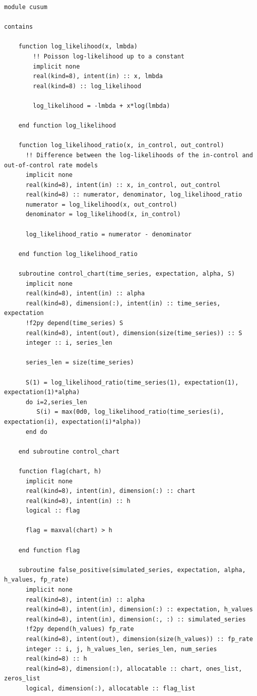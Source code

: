 \documentclass[11pt]{report}
\begin{document}
\begin{verbatim}
module cusum

contains

    function log_likelihood(x, lmbda)
        !! Poisson log-likelihood up to a constant
        implicit none
        real(kind=8), intent(in) :: x, lmbda
        real(kind=8) :: log_likelihood

        log_likelihood = -lmbda + x*log(lmbda)
        
    end function log_likelihood

    function log_likelihood_ratio(x, in_control, out_control)
      !! Difference between the log-likelihoods of the in-control and out-of-control rate models  
      implicit none
      real(kind=8), intent(in) :: x, in_control, out_control
      real(kind=8) :: numerator, denominator, log_likelihood_ratio
      numerator = log_likelihood(x, out_control)
      denominator = log_likelihood(x, in_control)

      log_likelihood_ratio = numerator - denominator
      
    end function log_likelihood_ratio

    subroutine control_chart(time_series, expectation, alpha, S)
      implicit none
      real(kind=8), intent(in) :: alpha
      real(kind=8), dimension(:), intent(in) :: time_series, expectation
      !f2py depend(time_series) S
      real(kind=8), intent(out), dimension(size(time_series)) :: S
      integer :: i, series_len

      series_len = size(time_series)

      S(1) = log_likelihood_ratio(time_series(1), expectation(1), expectation(1)*alpha)
      do i=2,series_len
         S(i) = max(0d0, log_likelihood_ratio(time_series(i), expectation(i), expectation(i)*alpha))
      end do
      
    end subroutine control_chart

    function flag(chart, h)
      implicit none
      real(kind=8), intent(in), dimension(:) :: chart
      real(kind=8), intent(in) :: h
      logical :: flag

      flag = maxval(chart) > h

    end function flag

    subroutine false_positive(simulated_series, expectation, alpha, h_values, fp_rate)
      implicit none
      real(kind=8), intent(in) :: alpha
      real(kind=8), intent(in), dimension(:) :: expectation, h_values
      real(kind=8), intent(in), dimension(:, :) :: simulated_series
      !f2py depend(h_values) fp_rate
      real(kind=8), intent(out), dimension(size(h_values)) :: fp_rate
      integer :: i, j, h_values_len, series_len, num_series
      real(kind=8) :: h
      real(kind=8), dimension(:), allocatable :: chart, ones_list, zeros_list
      logical, dimension(:), allocatable :: flag_list


\end{verbatim}
\end{document}
